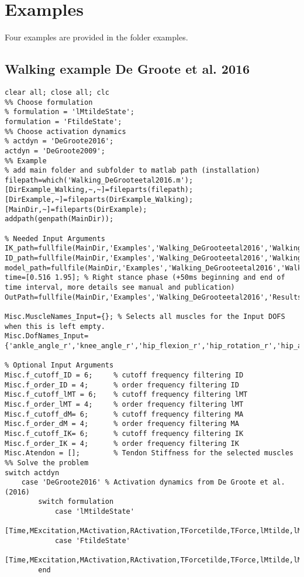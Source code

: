 \documentclass[a4paper,oneside,11pt]{article}
\begin{document}
\section{Examples}
\label{Examples}

Four examples are provided in the folder examples.
\subsection{Walking example De Groote et al. 2016}
\begin{lstlisting}[frame=none,basicstyle=\tiny]
clear all; close all; clc
%% Choose formulation
% formulation = 'lMtildeState';
formulation = 'FtildeState';
%% Choose activation dynamics
% actdyn = 'DeGroote2016';
actdyn = 'DeGroote2009';
%% Example
% add main folder and subfolder to matlab path (installation)
filepath=which('Walking_DeGrooteetal2016.m');
[DirExample_Walking,~,~]=fileparts(filepath); [DirExample,~]=fileparts(DirExample_Walking);[MainDir,~]=fileparts(DirExample);
addpath(genpath(MainDir));

% Needed Input Arguments
IK_path=fullfile(MainDir,'Examples','Walking_DeGrooteetal2016','WalkingData','inverse_kinematics.mot');
ID_path=fullfile(MainDir,'Examples','Walking_DeGrooteetal2016','WalkingData','inverse_dynamics.sto');
model_path=fullfile(MainDir,'Examples','Walking_DeGrooteetal2016','WalkingData','subject01.osim');
time=[0.516 1.95]; % Right stance phase (+50ms beginning and end of time interval, more details see manual and publication)
OutPath=fullfile(MainDir,'Examples','Walking_DeGrooteetal2016','Results');

Misc.MuscleNames_Input={}; % Selects all muscles for the Input DOFS when this is left empty.
Misc.DofNames_Input={'ankle_angle_r','knee_angle_r','hip_flexion_r','hip_rotation_r','hip_adduction_r'};

% Optional Input Arguments
Misc.f_cutoff_ID = 6;     % cutoff frequency filtering ID
Misc.f_order_ID = 4;      % order frequency filtering ID
Misc.f_cutoff_lMT = 6;    % cutoff frequency filtering lMT
Misc.f_order_lMT = 4;     % order frequency filtering lMT
Misc.f_cutoff_dM= 6;      % cutoff frequency filtering MA
Misc.f_order_dM = 4;      % order frequency filtering MA
Misc.f_cutoff_IK= 6;      % cutoff frequency filtering IK
Misc.f_order_IK = 4;      % order frequency filtering IK
Misc.Atendon = [];        % Tendon Stiffness for the selected muscles
%% Solve the problem
switch actdyn
    case 'DeGroote2016' % Activation dynamics from De Groote et al. (2016)      
        switch formulation
            case 'lMtildeState'
                [Time,MExcitation,MActivation,RActivation,TForcetilde,TForce,lMtilde,lM,MuscleNames,OptInfo,DatStore]=SolveMuscleRedundancy_lMtildeState(model_path,IK_path,ID_path,time,OutPath,Misc);
            case 'FtildeState'   
                [Time,MExcitation,MActivation,RActivation,TForcetilde,TForce,lMtilde,lM,MuscleNames,OptInfo,DatStore]=SolveMuscleRedundancy_FtildeState(model_path,IK_path,ID_path,time,OutPath,Misc);
        end
        

\end{lstlisting}
\end{document}
